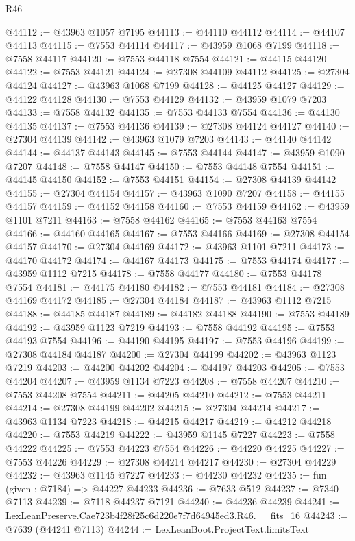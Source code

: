 \begin{lexlean}{R46}
\begin{coremodule}
@44112 := @43963 @1057 @7195
@44113 := @44110 @44112
@44114 := @44107 @44113
@44115 := @7553 @44114
@44117 := @43959 @1068 @7199
@44118 := @7558 @44117
@44120 := @7553 @44118 @7554
@44121 := @44115 @44120
@44122 := @7553 @44121
@44124 := @27308 @44109 @44112
@44125 := @27304 @44124
@44127 := @43963 @1068 @7199
@44128 := @44125 @44127
@44129 := @44122 @44128
@44130 := @7553 @44129
@44132 := @43959 @1079 @7203
@44133 := @7558 @44132
@44135 := @7553 @44133 @7554
@44136 := @44130 @44135
@44137 := @7553 @44136
@44139 := @27308 @44124 @44127
@44140 := @27304 @44139
@44142 := @43963 @1079 @7203
@44143 := @44140 @44142
@44144 := @44137 @44143
@44145 := @7553 @44144
@44147 := @43959 @1090 @7207
@44148 := @7558 @44147
@44150 := @7553 @44148 @7554
@44151 := @44145 @44150
@44152 := @7553 @44151
@44154 := @27308 @44139 @44142
@44155 := @27304 @44154
@44157 := @43963 @1090 @7207
@44158 := @44155 @44157
@44159 := @44152 @44158
@44160 := @7553 @44159
@44162 := @43959 @1101 @7211
@44163 := @7558 @44162
@44165 := @7553 @44163 @7554
@44166 := @44160 @44165
@44167 := @7553 @44166
@44169 := @27308 @44154 @44157
@44170 := @27304 @44169
@44172 := @43963 @1101 @7211
@44173 := @44170 @44172
@44174 := @44167 @44173
@44175 := @7553 @44174
@44177 := @43959 @1112 @7215
@44178 := @7558 @44177
@44180 := @7553 @44178 @7554
@44181 := @44175 @44180
@44182 := @7553 @44181
@44184 := @27308 @44169 @44172
@44185 := @27304 @44184
@44187 := @43963 @1112 @7215
@44188 := @44185 @44187
@44189 := @44182 @44188
@44190 := @7553 @44189
@44192 := @43959 @1123 @7219
@44193 := @7558 @44192
@44195 := @7553 @44193 @7554
@44196 := @44190 @44195
@44197 := @7553 @44196
@44199 := @27308 @44184 @44187
@44200 := @27304 @44199
@44202 := @43963 @1123 @7219
@44203 := @44200 @44202
@44204 := @44197 @44203
@44205 := @7553 @44204
@44207 := @43959 @1134 @7223
@44208 := @7558 @44207
@44210 := @7553 @44208 @7554
@44211 := @44205 @44210
@44212 := @7553 @44211
@44214 := @27308 @44199 @44202
@44215 := @27304 @44214
@44217 := @43963 @1134 @7223
@44218 := @44215 @44217
@44219 := @44212 @44218
@44220 := @7553 @44219
@44222 := @43959 @1145 @7227
@44223 := @7558 @44222
@44225 := @7553 @44223 @7554
@44226 := @44220 @44225
@44227 := @7553 @44226
@44229 := @27308 @44214 @44217
@44230 := @27304 @44229
@44232 := @43963 @1145 @7227
@44233 := @44230 @44232
@44235 := fun (given : @7184) => @44227 @44233
@44236 := @7633 @512
@44237 := @7340 @7113
@44239 := @7118 @44237 @7121
@44240 := @44236 @44239
@44241 := LexLeanPreserve.Cae723b4f28f25c6d220e7f7d64945ed3.R46.__fits_16
@44243 := @7639 (@44241 @7113)
@44244 := LexLeanBoot.ProjectText.limitsText

\end{coremodule}
\end{lexlean}

